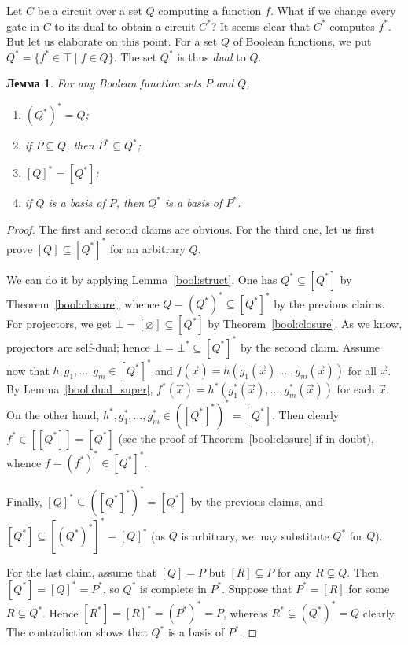 \documentclass[12pt,notitlepage]{article}
\theoremstyle{plain}
\newtheorem{lemma}[thm]{Лемма}
\theoremstyle{definition}
\theoremstyle{plain}
\newcommand{\sbs}{\subseteq}
\newcommand{\void}{\varnothing}
\newcommand{\1}{\mathbf{1}}
\newcommand{\0}{\mathbf{0}}
\begin{document}
Let $C$ be a circuit over a set $Q$ computing a function $f$. What if we change every gate in $C$ to its dual to obtain a circuit $C^*$? It seems clear that $C^*$ computes $f^*$. But let us elaborate on this point. For a set $Q$ of Boolean functions, we put $Q^* = \{ f^* \in \top \mid f \in Q \}$. The set $Q^*$ is thus \emph{dual} to $Q$.
\begin{lemma}\label{bool:dual_closure} For any Boolean function sets $P$ and $Q$,
	\begin{enumerate}
		\item $(Q^*)^* = Q$;
		\item if $P \sbs Q$, then $P^* \sbs Q^*$;
		\item $[Q]^* = [Q^*]$;
		\item if $Q$ is a basis of $P$, then $Q^*$ is a basis of $P^*$.
	\end{enumerate}
\end{lemma}
\begin{proof}
	The first and second claims are obvious. For the third one, let us first prove $[Q] \sbs [Q^*]^*$ for an arbitrary $Q$.
	
	We can do it by applying Lemma~\ref{bool:struct}. One has $Q^* \sbs [Q^*]$ by Theorem~\ref{bool:closure}, whence $Q = (Q^*)^* \sbs [Q^*]^*$ by the previous claims. For projectors, we get $\bot = [\void] \sbs [Q^*]$ by Theorem~\ref{bool:closure}. As we know, projectors are self-dual; hence $\bot = \bot^* \sbs [Q^*]^*$ by the second claim. Assume now that $h, g_1, \ldots, g_m \in [Q^*]^*$ and $f(\vec x) = h(g_1(\vec x),\ldots, g_m(\vec x))$ for all $\vec x$. By Lemma~\ref{bool:dual_super}, $f^*(\vec x) = h^*(g^*_1(\vec x),\ldots, g^*_m(\vec x))$ for each $\vec x$. On the other hand, $h^*, g^*_1, \ldots, g^*_m \in ([Q^*]^*)^* = [Q^*]$. Then clearly $f^* \in [[Q^*]] = [Q^*]$ (see the proof of Theorem~\ref{bool:closure} if in doubt), whence $f = (f^*)^* \in [Q^*]^*$.
	
	Finally, $[Q]^* \sbs ([Q^*]^*)^* = [Q^*]$ by the previous claims, and $[Q^*] \sbs [(Q^*)^*]^* = [Q]^*$ (as $Q$ is arbitrary, we may substitute $Q^*$ for $Q$).
	
	For the last claim, assume that $[Q] = P$ but $[R] \subsetneq P$ for any $R \subsetneq Q$. Then $[Q^*] = [Q]^* = P^*$, so $Q^*$ is complete in $P^*$. Suppose that $P^* = [R]$ for some $R \subsetneq Q^*$. Hence $[R^*] = [R]^* = (P^*)^* = P$, whereas $R^* \subsetneq (Q^*)^* = Q$ clearly. The contradiction shows that $Q^*$ is a basis of $P^*$.
\end{proof}
\end{document}
